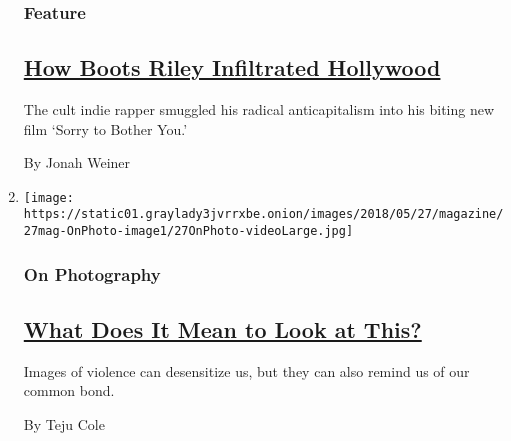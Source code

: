\begin{enumerate}
  \hypertarget{feature-2}{%
  \subsubsection{Feature}\label{feature-2}}

  \hypertarget{how-boots-riley-infiltrated-hollywood}{%
  \subsection{\texorpdfstring{\href{/2018/05/22/magazine/how-boots-riley-infiltrated-hollywood.html}{How
  Boots Riley Infiltrated
  Hollywood}}{How Boots Riley Infiltrated Hollywood}}\label{how-boots-riley-infiltrated-hollywood}}

  The cult indie rapper smuggled his radical anticapitalism into his
  biting new film `Sorry to Bother You.'

  By Jonah Weiner
\item
  \texttt{[image: https://static01.graylady3jvrrxbe.onion/images/2018/05/27/magazine/27mag-OnPhoto-image1/27OnPhoto-videoLarge.jpg]}

  \hypertarget{on-photography}{%
  \subsubsection{On Photography}\label{on-photography}}

  \hypertarget{what-does-it-mean-to-look-at-this}{%
  \subsection{\texorpdfstring{\href{/2018/05/24/magazine/what-does-it-mean-to-look-at-this.html}{What
  Does It Mean to Look at
  This?}}{What Does It Mean to Look at This?}}\label{what-does-it-mean-to-look-at-this}}

  Images of violence can desensitize us, but they can also remind us of
  our common bond.

  By Teju Cole
\end{enumerate}

